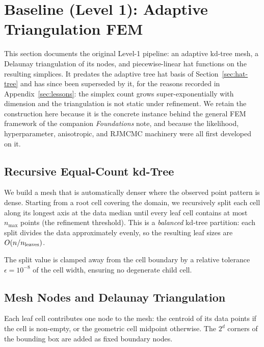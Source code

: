 \documentclass[11pt]{article}
\begin{document}
\section{Baseline (Level 1): Adaptive Triangulation FEM}
\label{sec:baseline}
\label{sec:adaptive-tri}

This section documents the original Level-1 pipeline: an adaptive kd-tree mesh,
a Delaunay triangulation of its nodes, and piecewise-linear hat functions on the
resulting simplices.  It predates the adaptive tree hat basis of
Section~\ref{sec:hat-tree} and has since been superseded by it, for the reasons
recorded in Appendix~\ref{sec:lessons}: the simplex count grows
super-exponentially with dimension and the triangulation is not static under
refinement.  We retain the construction here because it is the concrete instance
behind the general FEM framework of the companion \emph{Foundations} note, and
because the likelihood, hyperparameter, anisotropic, and RJMCMC machinery were
all first developed on it.

\subsection{Recursive Equal-Count kd-Tree}

We build a mesh that is automatically denser where the observed point pattern is
dense.  Starting from a root cell covering the domain, we recursively split
each cell along its longest axis at the data median until every leaf cell
contains at most $n_{\max}$ points (the refinement threshold).  This is a
\emph{balanced} kd-tree partition: each split divides the data approximately
evenly, so the resulting leaf sizes are $O(n/n_{\rm leaves})$.

The split value is clamped away from the cell boundary by a relative tolerance
$\epsilon = 10^{-8}$ of the cell width, ensuring no degenerate child cell.

\subsection{Mesh Nodes and Delaunay Triangulation}

Each leaf cell contributes one node to the mesh: the centroid of its data
points if the cell is non-empty, or the geometric cell midpoint otherwise.
The $2^d$ corners of the bounding box are added as fixed boundary nodes.
\end{document}
